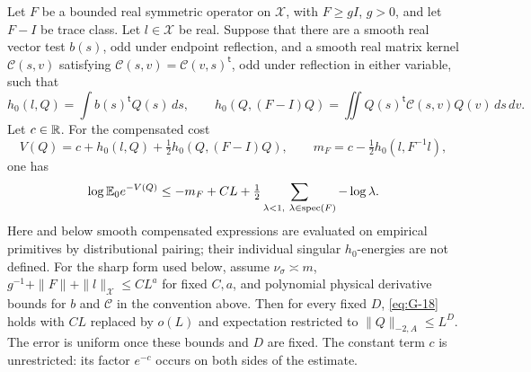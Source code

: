 \begin{lemma}\label{lem:04-quadratic}\label{E:quadratic-integration}
Let \(F\) be a bounded real symmetric operator on \(\mathcal X\), with
\(F\ge gI\), \(g>0\), and let \(F-I\) be trace class. Let \(l\in\mathcal X\) be real. Suppose that there are a smooth real vector test \(b(s)\), odd under endpoint reflection, and a smooth real matrix kernel \(\mathscr C(s,v)\) satisfying \(\mathscr C(s,v)=\mathscr C(v,s)^{\mathsf t}\), odd under reflection in either variable, such that
\[
 h_0(l,Q)=\int b(s)^{\mathsf t}Q(s)\,ds,\qquad
 h_0(Q,(F-I)Q)=\iint Q(s)^{\mathsf t}\mathscr C(s,v)Q(v)\,ds\,dv.
\]
Let \(c\in\mathbb R\). For the compensated cost
\[
 V(Q)=c+h_0(l,Q)+\tfrac12h_0(Q,(F-I)Q),\qquad
 m_F=c-\tfrac12h_0(l,F^{-1}l),
\]
one has
\begin{equation}
 \log\E_0e^{-V(Q)}
 \le -m_F+CL+\tfrac12\sum_{\lambda<1,\ \lambda\in\operatorname{spec}(F)}
                    -\log\lambda .
 \label{eq:G-18}
\end{equation}
Here and below smooth compensated expressions are evaluated on empirical
primitives by distributional pairing; their individual singular
\(h_0\)-energies are not defined. For the sharp form used below, assume \(\nu_\sigma\asymp m\),
\(g^{-1}+\|F\|+\|l\|_{\mathcal X}\le CL^a\) for fixed \(C,a\), and polynomial physical derivative bounds for \(b\) and \(\mathscr C\) in the convention above. Then for every fixed \(D\), \eqref{eq:G-18} holds with \(CL\) replaced by \(o(L)\) and expectation restricted to \(\|Q\|_{-2,A}\le L^D\). The error is uniform once these bounds and \(D\) are fixed. The constant term \(c\) is unrestricted: its factor \(e^{-c}\) occurs on both sides of the estimate.
\end{lemma}

